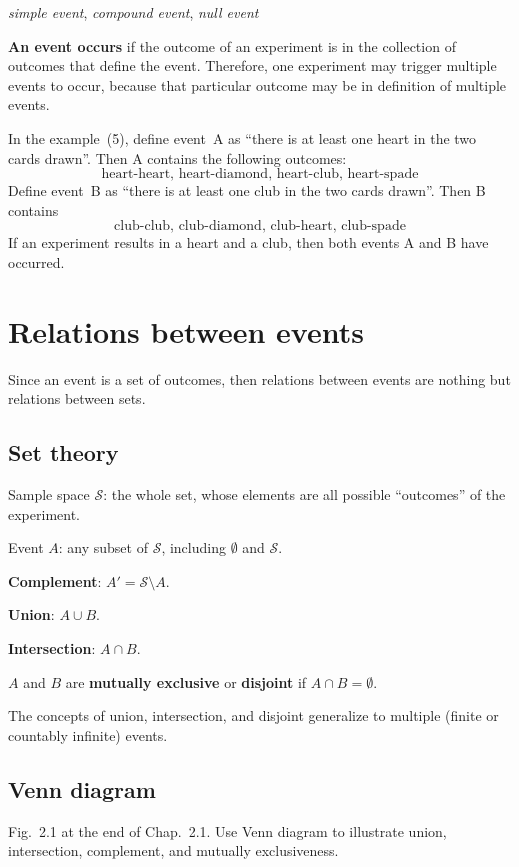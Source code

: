 \documentclass[12pt]{article}
\begin{document}
\emph{simple event}, \emph{compound event}, \emph{null event}

\textbf{An event occurs} if the outcome of an experiment
is in the collection of
outcomes that define the event. Therefore, one experiment may trigger
multiple events to occur, because that particular outcome may be in
definition of multiple events.


\example
In the example~(5), define event~A as ``there is at least one heart
in the two cards drawn''. Then A contains the following outcomes:
\[
\text{heart-heart, heart-diamond, heart-club, heart-spade}
\]
Define event~B as ``there is at least one club in the
two cards drawn''. Then B contains
\[
\text{club-club, club-diamond, club-heart, club-spade}
\]
If an experiment results in a heart and a club,
then both events A and B have occurred.


\section{Relations between events}

Since an event is a set of outcomes,
then relations between events are nothing but relations between sets.

\subsection{Set theory}

Sample space $\mathcal{S}$: the whole set,
whose elements are all possible ``outcomes'' of the experiment.

Event $A$: any subset of $\mathcal{S}$, including $\emptyset$ and $\mathcal{S}$.

\textbf{Complement}: $A' = \mathcal{S} \setminus A$.

\textbf{Union}: $A \cup B$.

\textbf{Intersection}: $A \cap B$.

$A$ and $B$ are \textbf{mutually exclusive} or \textbf{disjoint} if
$A \cap B = \emptyset$.

The concepts of union, intersection, and disjoint generalize to multiple
(finite or countably infinite) events.

\subsection{Venn diagram}

\example Fig.~2.1 at the end of Chap.~2.1.
Use Venn diagram to illustrate
union, intersection, complement, and mutually exclusiveness.
\end{document}
